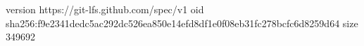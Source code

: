 version https://git-lfs.github.com/spec/v1
oid sha256:f9e2341dedc5ac292dc526ea850e14efd8df1e0f08eb31fc278bcfc6d8259d64
size 349692
